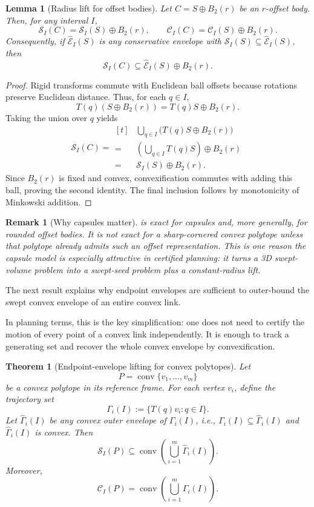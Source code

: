 \documentclass[journal]{IEEEtran}
\newtheorem{theorem}{Theorem}
\newtheorem{remark}{Remark}
\newtheorem{lemma}{Lemma}
\begin{document}
\begin{lemma}[Radius lift for offset bodies]\label{lem:offset_lift}
Let $C = S \oplus B_2(r)$ be an $r$-offset body. Then, for any interval $I$,
\[
\mathcal{S}_I(C) = \mathcal{S}_I(S) \oplus B_2(r),
\qquad
\mathcal{C}_I(C) = \mathcal{C}_I(S) \oplus B_2(r).
\]
Consequently, if $\widehat{\mathcal{E}}_I(S)$ is any conservative envelope with
$\mathcal{S}_I(S) \subseteq \widehat{\mathcal{E}}_I(S)$, then
\[
\mathcal{S}_I(C) \subseteq \widehat{\mathcal{E}}_I(S) \oplus B_2(r).
\]
\end{lemma}

\begin{proof}
Rigid transforms commute with Euclidean ball offsets because rotations preserve
Euclidean distance. Thus, for each $q \in I$,
\[
T(q)(S \oplus B_2(r)) = T(q)S \oplus B_2(r).
\]
Taking the union over $q$ yields
\[
\mathcal{S}_I(C)
= \begin{aligned}[t]
&\bigcup_{q\in I} \bigl(T(q)S \oplus B_2(r)\bigr) \\
=\;&\left(\bigcup_{q\in I} T(q)S\right) \oplus B_2(r) \\
=\;&\mathcal{S}_I(S) \oplus B_2(r).
\end{aligned}
\]
Since $B_2(r)$ is fixed and convex, convexification commutes with adding this
ball, proving the second identity. The final inclusion follows by monotonicity
of Minkowski addition.
\end{proof}

\begin{remark}[Why capsules matter]\label{rem:capsule_exact}
 is exact for capsules and, more generally, for rounded
offset bodies. It is not exact for a sharp-cornered convex polytope unless that
polytope already admits such an offset representation. This is one reason the
capsule model is especially attractive in certified planning: it turns a 3D
swept-volume problem into a swept-seed problem plus a constant-radius lift.
\end{remark}

The next result explains why endpoint envelopes are sufficient to outer-bound
the swept convex envelope of an entire convex link.

In planning terms, this is the key simplification: one does not need to certify
the motion of every point of a convex link independently. It is enough to track
a generating set and recover the whole convex envelope by convexification.

\begin{theorem}[Endpoint-envelope lifting for convex polytopes]
\label{thm:vertex_lift}
Let
\[
P = \operatorname{conv}\{v_1,\dots,v_m\}
\]
be a convex polytope in its reference frame. For each vertex $v_i$, define the
trajectory set
\[
\Gamma_i(I) := \{T(q)v_i : q\in I\}.
\]
Let $\widehat{\Gamma}_i(I)$ be any convex outer envelope of $\Gamma_i(I)$, i.e.,
$\Gamma_i(I) \subseteq \widehat{\Gamma}_i(I)$ and
$\widehat{\Gamma}_i(I)$ is convex. Then
\[
\mathcal{S}_I(P)
\subseteq
\operatorname{conv}\left(\bigcup_{i=1}^m \widehat{\Gamma}_i(I)\right).
\]
Moreover,
\[
\mathcal{C}_I(P)
=
\operatorname{conv}\left(\bigcup_{i=1}^m \Gamma_i(I)\right).
\]
\end{theorem}
\end{document}
